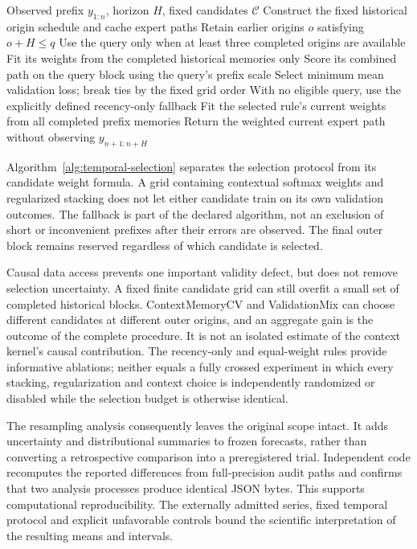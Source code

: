 \begin{algorithm}[htbp]
\caption{Temporally completed candidate selection. Every expert forecast and
validation target used to choose a combination is available before the current
reserved target block begins.}
\label{alg:temporal-selection}
\begin{algorithmic}[1]
\Require Observed prefix $y_{1:n}$, horizon $H$, fixed candidates $\mathcal C$
\State Construct the fixed historical origin schedule and cache expert paths
\State Retain earlier origins $o$ satisfying $o+H\leq q$
\State Use the query only when at least three completed origins are available
\State Fit its weights from the completed historical memories only
\State Score its combined path on the query block using the query's prefix scale
\EndFor
\EndFor
\State Select minimum mean validation loss; break ties by the fixed grid order
\State With no eligible query, use the explicitly defined recency-only fallback
\State Fit the selected rule's current weights from all completed prefix memories
\State Return the weighted current expert path without observing $y_{n+1:n+H}$
\end{algorithmic}
\end{algorithm}

Algorithm~\ref{alg:temporal-selection} separates the selection protocol from
its candidate weight formula. A grid containing contextual softmax weights and
regularized stacking does not let either candidate train on its own validation
outcomes. The fallback is part of the declared algorithm, not an exclusion of
short or inconvenient prefixes after their errors are observed. The final
outer block remains reserved regardless of which candidate is selected.

Causal data access prevents one important validity defect, but does not remove
selection uncertainty. A fixed finite candidate grid can still overfit a small
set of completed historical blocks. ContextMemoryCV and ValidationMix can
choose different candidates at different outer origins, and an aggregate
gain is the outcome of the complete procedure. It is not an isolated estimate
of the context kernel's causal contribution. The recency-only and equal-weight
rules provide informative ablations; neither equals a fully crossed experiment
in which every stacking, regularization and context choice is independently
randomized or disabled while the selection budget is otherwise identical.

The resampling analysis consequently leaves the original scope intact. It
adds uncertainty and distributional summaries to frozen forecasts, rather
than converting a retrospective comparison into a preregistered trial.
Independent code recomputes the reported differences from full-precision
audit paths and confirms that two analysis processes produce identical JSON
bytes. This supports computational reproducibility. The externally admitted
series, fixed temporal protocol and explicit unfavorable controls bound the
scientific interpretation of the resulting means and intervals.
